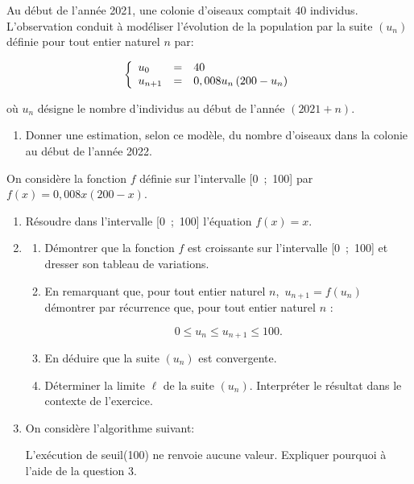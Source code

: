 \medskip

Au début de l'année 2021, une colonie d'oiseaux comptait $40$ individus. L'observation conduit à modéliser l'évolution de la population par la suite $\left(u_n\right)$ définie pour tout entier naturel $n$ par:

\[\left\{\begin{array}{l c l}
u_0&=&40\\
u_{n+1}&=&0,008u_n\left(200 - u_n\right)
\end{array}\right.\]

où $u_n$ désigne le nombre d'individus au début de l'année $(2021+n)$.

\medskip


\begin{enumerate}
\item Donner une estimation, selon ce modèle, du nombre d'oiseaux dans la colonie au
début de l'année 2022.
\end{enumerate}

On considère la fonction $f$ définie sur l'intervalle [0~;~100] par $f(x) = 0,008x(200 - x)$.

\begin{enumerate}[resume]
\item Résoudre dans l'intervalle [0~;~100] l'équation $f(x) = x$.
\item
	\begin{enumerate}
		\item Démontrer que la fonction $f$ est croissante sur l'intervalle [0~;~100] et dresser son tableau de variations.
		\item En remarquant que, pour tout entier naturel $n$,\, $u_{n+1} = f\left(u_n\right)$ démontrer par récurrence que, pour tout entier naturel $n$ :

\[0 \leqslant u_n \leqslant u_{n+1} \leqslant 100.\]

		\item En déduire que la suite $\left(u_n\right)$ est convergente.
		\item Déterminer la limite $\ell$ de la suite $\left(u_n\right)$. Interpréter le résultat dans le contexte de l'exercice.
	\end{enumerate}
\item On considère l'algorithme suivant:

\begin{center}
\end{center}

L'exécution de seuil(100) ne renvoie aucune valeur. Expliquer pourquoi à l'aide de la question 3.
\end{enumerate}

\bigskip
